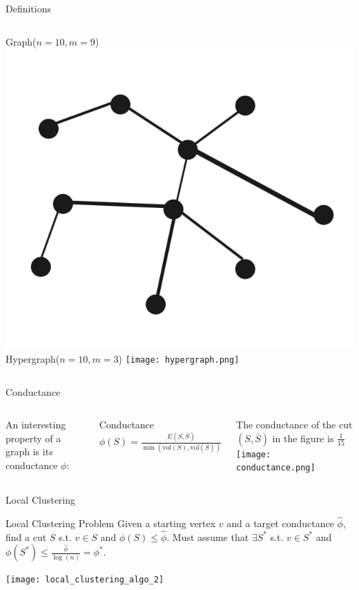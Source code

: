 \documentclass[../main.tex]{subfiles}
\begin{document}
	
	\begin{frame}{Definitions}
		\begin{columns}
				Graph($n=10, m=9$)
				\includegraphics[width=1.0\textwidth]{Figures/graph}
				Hypergraph($n=10, m=3$)
				\texttt{[image: hypergraph.png]}
		\end{columns}
	\end{frame}

    \begin{frame}{Conductance} 
    	\begin{columns}
    		\column{0.5\textwidth}
				An interesting property of a graph is its conductance $\phi$:
	
	           	\begin{block}{Conductance}
	           		$\phi(S) = \frac{E(S, \bar{S})}{\min(\text{vol}(S), \text{vol}(\bar{S}))}$
	           	\end{block}
           		
           		The conductance of the cut $(S, \bar{S})$ in the figure is $\frac{1}{15}$
	            \texttt{[image: conductance.png]}
        \end{columns}
    \end{frame}

	\begin{frame}{Local Clustering}
		\begin{block}{Local Clustering Problem}
			Given a starting vertex $v$ and a target conductance $\hat{\phi}$, find a cut $S$ s.t. $v\in S$ and $\phi(S) \leq \hat{\phi}$. Must assume that $\exists S^*$ s.t. $v\in S^*$ and $\phi(S^*) \leq \frac{\hat{\phi}}{\log(n)} = \phi^*$.
		\end{block}
		\texttt{[image: local\_clustering\_algo\_2]}
	\end{frame}
    
\end{document}
